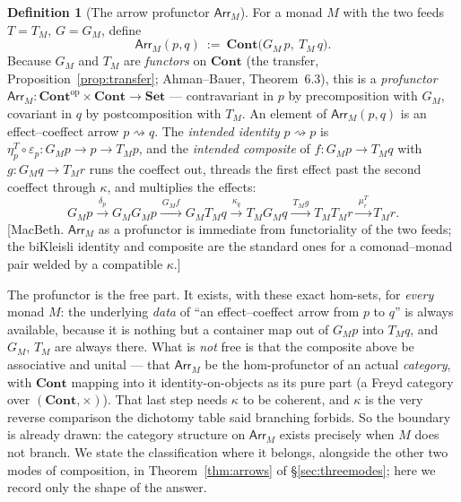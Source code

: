 \documentclass[11pt,a4paper]{book}
\newcommand{\Set}{\mathbf{Set}}
\newcommand{\Cont}{\mathbf{Cont}}
\newcommand{\op}{^{\mathrm{op}}}
\newcommand{\Arr}{\mathsf{Arr}}
\theoremstyle{plain}
\theoremstyle{definition}
\newtheorem{Definition}[Theorem]{Definition}
\theoremstyle{remark}
\newcommand{\prov}[1]{\hfill\textsf{\footnotesize[#1]}}
\begin{document}
\begin{Definition}[The arrow profunctor $\Arr_{M}$]\label{def:arrowprof}
For a monad $M$ with the two feeds $T=T_{M}$, $G=G_{M}$, define
\[
  \Arr_{M}(p,q)\ :=\ \Cont\bigl(G_{M}\,p,\ T_{M}\,q\bigr).
\]
Because $G_{M}$ and $T_{M}$ are \emph{functors} on $\Cont$ (the transfer,
Proposition~\ref{prop:transfer}; Ahman--Bauer, Theorem~6.3), this is a
\emph{profunctor} $\Arr_{M}\colon\Cont\op\times\Cont\to\Set$ --- contravariant in $p$ by
precomposition with $G_{M}$, covariant in $q$ by postcomposition with $T_{M}$. An element of
$\Arr_{M}(p,q)$ is an effect--coeffect arrow $p\rightsquigarrow q$. The \emph{intended identity}
$p\rightsquigarrow p$ is $\eta^{T}_{p}\circ\varepsilon_{p}\colon G_{M}p\to p\to T_{M}p$, and the
\emph{intended composite} of $f\colon G_{M}p\to T_{M}q$ with $g\colon G_{M}q\to T_{M}r$ runs the
coeffect out, threads the first effect past the second coeffect through $\kappa$, and multiplies the
effects:
\[
  G_{M}p\xrightarrow{\ \delta_{p}\ }G_{M}G_{M}p
        \xrightarrow{\ G_{M}f\ }G_{M}T_{M}q
        \xrightarrow{\ \kappa_{q}\ }T_{M}G_{M}q
        \xrightarrow{\ T_{M}g\ }T_{M}T_{M}r
        \xrightarrow{\ \mu^{T}_{r}\ }T_{M}r.
\]
\prov{MacBeth. $\Arr_{M}$ as a profunctor is immediate from functoriality of the two feeds; the
biKleisli identity and composite are the standard ones for a comonad--monad pair welded by a
compatible $\kappa$.}
\end{Definition}

The profunctor is the free part. It exists, with these exact hom-sets, for \emph{every} monad
$M$: the underlying \emph{data} of ``an effect--coeffect arrow from $p$ to $q$'' is always available,
because it is nothing but a container map out of $G_{M}p$ into $T_{M}q$, and $G_{M}$, $T_{M}$ are
always there. What is \emph{not} free is that the composite above be associative and unital ---
that $\Arr_{M}$ be the hom-profunctor of an actual \emph{category}, with $\Cont$ mapping into it
identity-on-objects as its pure part (a Freyd category over $(\Cont,\times)$). That last step needs
$\kappa$ to be coherent, and $\kappa$ is the very reverse comparison the dichotomy table said branching
forbids. So the boundary is already drawn: the category structure on $\Arr_{M}$ exists precisely when
$M$ does not branch. We state the classification where it belongs, alongside the other two modes of
composition, in Theorem~\ref{thm:arrows} of \S\ref{sec:threemodes}; here we record only the shape of
the answer.
\end{document}
